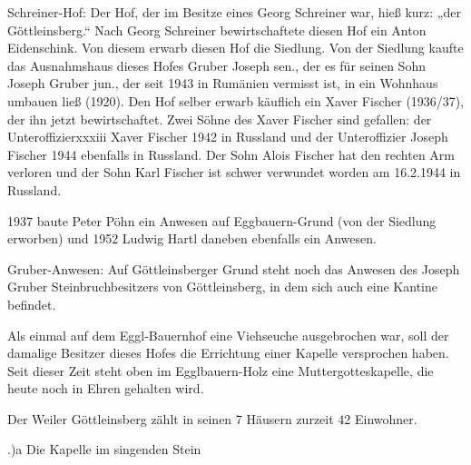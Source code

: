 Schreiner-Hof: Der Hof, der im Besitze eines Georg Schreiner war, hieß kurz:
„der Göttleinsberg.“ Nach Georg Schreiner bewirtschaftete diesen Hof ein Anton
Eidenschink. Von diesem erwarb diesen Hof die Siedlung. Von der Siedlung kaufte
das Ausnahmshaus dieses Hofes Gruber Joseph sen., der es für seinen Sohn Joseph
Gruber jun., der seit 1943 in Rumänien vermisst ist, in ein Wohnhaus umbauen
ließ (1920). Den Hof selber erwarb käuflich ein Xaver Fischer (1936/37), der ihn
jetzt bewirtschaftet. Zwei Söhne des Xaver Fischer sind gefallen: der
Unteroffizierxxxiii Xaver Fischer 1942 in Russland und der Unteroffizier Joseph
Fischer 1944 ebenfalls in Russland. Der Sohn Alois Fischer hat den rechten Arm
verloren und der Sohn Karl Fischer ist schwer verwundet worden am 16.2.1944 in
Russland.

1937 baute Peter Pöhn ein Anwesen auf Eggbauern-Grund (von der Siedlung
erworben) und 1952 Ludwig Hartl daneben ebenfalls ein Anwesen.

Gruber-Anwesen: Auf Göttleinsberger Grund steht noch das Anwesen des Joseph
Gruber Steinbruchbesitzers von Göttleinsberg, in dem sich auch eine Kantine
befindet.

Als einmal auf dem Eggl-Bauernhof eine Viehseuche ausgebrochen war, soll der
damalige Besitzer dieses Hofes die Errichtung einer Kapelle versprochen haben.
Seit dieser Zeit steht oben im Egglbauern-Holz eine Muttergotteskapelle, die
heute noch in Ehren gehalten wird.

Der Weiler Göttleinsberg zählt in seinen 7 Häusern zurzeit 42 Einwohner.

.)a Die Kapelle im singenden Stein

